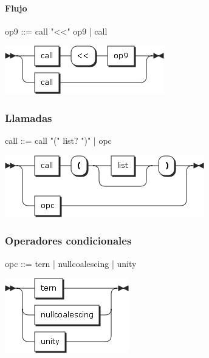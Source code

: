 \paragraph{Flujo}
\begin{multicols}{2}
\begin{myverbatim}      
op9  ::= call "<<" op9
      |  call
\end{myverbatim}  
\columnbreak	
\begin{center}
\includegraphics[scale=0.5]{diagram/op9.png} \\
\end{center}
\end{multicols}

\subsubsection{Llamadas}
\begin{multicols}{2}
\begin{myverbatim}      
call ::= call "(" list? ")"
      |  opc
\end{myverbatim}  
\columnbreak	
\begin{center}
\includegraphics[scale=0.5]{diagram/call.png} \\
\end{center}
\end{multicols}

\subsubsection{Operadores condicionales}
\begin{multicols}{2}
\begin{myverbatim}      
opc ::=  tern
      |  nullcoalescing
      |  unity
\end{myverbatim}  
\columnbreak	
\begin{center}
\includegraphics[scale=0.5]{diagram/opc.png} \\
\end{center}
\end{multicols}
